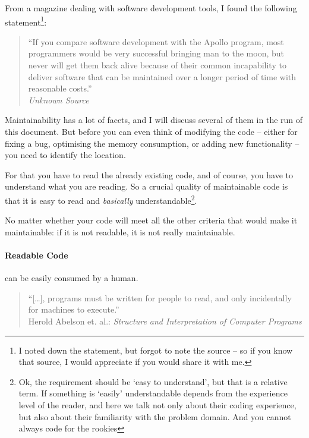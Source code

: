 \documentclass[11pt,a4paper, titlepage, parskip=half, headsepline, footsepline, cleardoublepage=current, headheight=1cm]{scrbook}
\begin{document}
From a magazine dealing with software development tools, I found the following statement\footnote{I noted down the statement, but forgot to note the source – so if you know that source, I would appreciate if you would share it with me.}:

\begin{quote}
“If you compare software development with the Apollo program, most programmers would be very successful bringing man to the moon, but never will get them back alive because of their common incapability to deliver software that can be maintained over a longer period of time with reasonable costs.” \\
\textit{Unknown Source}\autocite{UnknownSource1}
\end{quote}

Maintainability has a lot of facets, and I will discuss several of them in the run of this document. But before you can even think of modifying the code – either for fixing a bug, optimising the memory consumption, or adding new functionality – you need to identify the location.  

For that you have to read the already existing code, and of course, you have to understand what you are reading. So a crucial quality of maintainable code is that it is easy to read and \textit{basically} understandable\footnote{Ok, the requirement should be ‘easy to understand’, but that is a relative term. If something is ‘easily’ understandable depends from the experience level of the reader, and here we talk not only about their coding experience, but also about their familiarity with the problem domain. And you cannot always code for the rookies}.

No matter whether your code will meet all the other criteria that would make it maintainable: if it is not readable, it is not really maintainable. 

\paragraph{Readable Code} can be easily consumed by a human.

\begin{quote}
“[…], programs must be written for people to read, and only incidentally for machines to execute.”\\
Herold Abelson et. al.: \textit{Structure and Interpretation of Computer Programs}
\autocite{Sussman:StructureAndInterpretationOfComputerPrograms}
\end{quote}
\end{document}
